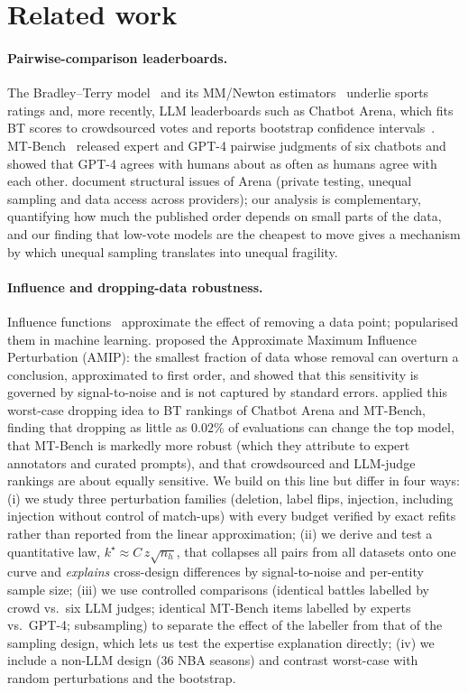 \section{Related work}
\label{sec:related}

\paragraph{Pairwise-comparison leaderboards.}
The Bradley--Terry model~\citep{bradley1952rank} and its MM/Newton estimators~\citep{hunter2004mm} underlie sports ratings and, more recently, LLM leaderboards such as Chatbot Arena, which fits BT scores to crowdsourced votes and reports bootstrap confidence intervals~\citep{chiang2024chatbot}.
MT-Bench~\citep{zheng2023judging} released expert and GPT-4 pairwise judgments of six chatbots and showed that GPT-4 agrees with humans about as often as humans agree with each other.
\citet{singh2025leaderboard} document structural issues of Arena (private testing, unequal sampling and data access across providers); our analysis is complementary, quantifying how much the published order depends on small parts of the data, and our finding that low-vote models are the cheapest to move gives a mechanism by which unequal sampling translates into unequal fragility.

\paragraph{Influence and dropping-data robustness.}
Influence functions~\citep{hampel1974influence,cook1977detection} approximate the effect of removing a data point; \citet{koh2017understanding} popularised them in machine learning.
\citet{broderick2020automatic} proposed the Approximate Maximum Influence Perturbation (AMIP): the smallest fraction of data whose removal can overturn a conclusion, approximated to first order, and showed that this sensitivity is governed by signal-to-noise and is not captured by standard errors.
\citet{huang2025dropping} applied this worst-case dropping idea to BT rankings of Chatbot Arena and MT-Bench, finding that dropping as little as $0.02\%$ of evaluations can change the top model, that MT-Bench is markedly more robust (which they attribute to expert annotators and curated prompts), and that crowdsourced and LLM-judge rankings are about equally sensitive.
We build on this line but differ in four ways: (i) we study three perturbation families (deletion, label flips, injection, including injection without control of match-ups) with every budget verified by exact refits rather than reported from the linear approximation; (ii) we derive and test a quantitative law, $k^\star\approx C\,z\sqrt{n_h}$, that collapses all pairs from all datasets onto one curve and \emph{explains} cross-design differences by signal-to-noise and per-entity sample size; (iii) we use controlled comparisons (identical battles labelled by crowd vs.\ six LLM judges; identical MT-Bench items labelled by experts vs.\ GPT-4; subsampling) to separate the effect of the labeller from that of the sampling design, which lets us test the expertise explanation directly; (iv) we include a non-LLM design (36 NBA seasons) and contrast worst-case with random perturbations and the bootstrap.

